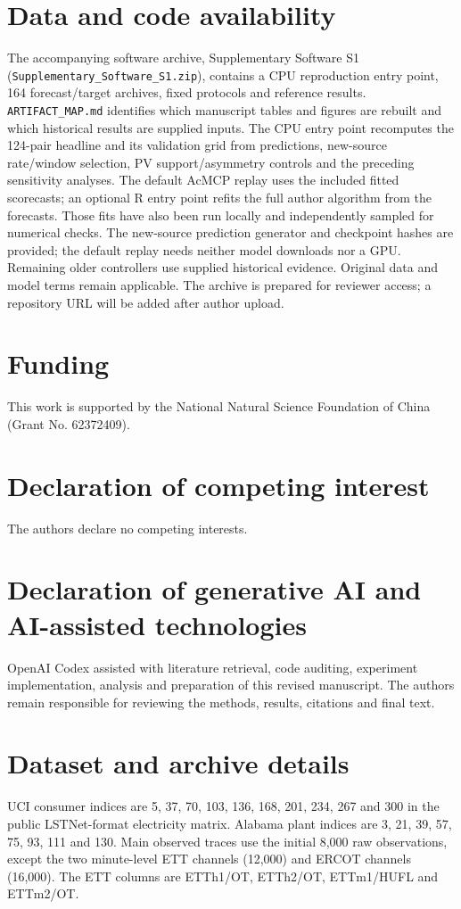 \documentclass[preprint,11pt]{elsarticle}
\begin{document}
\section*{Data and code availability}
The accompanying software archive, Supplementary Software S1
(\texttt{Supplementary\_Software\_S1.zip}), contains a CPU reproduction entry point,
164 forecast/target archives, fixed protocols and reference results.
\texttt{ARTIFACT\_MAP.md} identifies which manuscript tables and figures are rebuilt
and which historical results are supplied inputs. The CPU entry point recomputes the
124-pair headline and its validation grid from predictions, new-source rate/window
selection, PV support/asymmetry controls and the preceding sensitivity analyses.
The default AcMCP replay uses the included fitted scorecasts; an optional R entry point
refits the full author algorithm from the forecasts. Those fits have also been run locally
and independently sampled for numerical checks. The new-source prediction generator and
checkpoint hashes are provided; the default replay needs neither model downloads nor a
GPU. Remaining older controllers use supplied historical evidence. Original data and model
terms remain applicable. The archive is prepared for reviewer access; a repository
URL will be added after author upload.

\section*{Funding}
This work is supported by the National Natural Science Foundation of China
(Grant No. 62372409).

\section*{Declaration of competing interest}
The authors declare no competing interests.

\section*{Declaration of generative AI and AI-assisted technologies}
OpenAI Codex assisted with literature retrieval, code auditing, experiment implementation,
analysis and preparation of this revised manuscript. The authors remain responsible
for reviewing the methods, results, citations and final text.

\clearpage
\appendix
\section{Dataset and archive details}\label{app:data}
UCI consumer indices are 5, 37, 70, 103, 136, 168, 201, 234, 267 and 300 in the public
LSTNet-format electricity matrix. Alabama plant indices are 3, 21, 39, 57, 75, 93, 111
and 130. Main observed traces use the initial 8,000 raw observations, except the two
minute-level ETT channels (12,000) and ERCOT channels (16,000). The ETT columns are
ETTh1/OT, ETTh2/OT, ETTm1/HUFL and ETTm2/OT.
\end{document}
